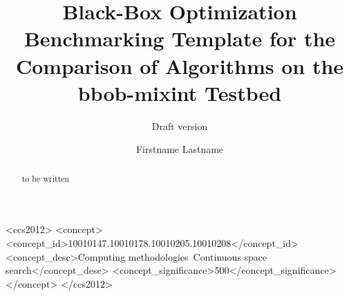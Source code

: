 \documentclass[sigconf]{acmart}
\newcommand{\bbobmixint}{{\ttfamily bbob-mixint}\xspace}
\begin{document}
\title{Black-Box Optimization Benchmarking Template for the Comparison of Algorithms on the \bbobmixint Testbed}
\renewcommand{\shorttitle}{Template to Compare Algorithms on the \bbobmixint Testbed}
\subtitle{Draft version}



\author{Firstname Lastname}
%
%
%
%
%
%
%

\renewcommand{\shortauthors}{Firstname Lastname et. al.}


\begin{abstract}
to be written
\end{abstract}


%
%
 \begin{CCSXML}
<ccs2012>
<concept>
<concept_id>10010147.10010178.10010205.10010208</concept_id>
<concept_desc>Computing methodologies~Continuous space search</concept_desc>
<concept_significance>500</concept_significance>
</concept>
</ccs2012>
\end{CCSXML}
\end{document}

